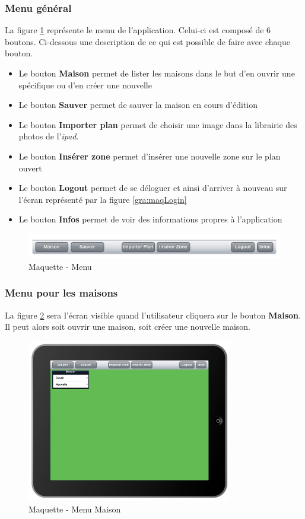 \subsubsection{Menu général}
La figure \ref{gra:maqmenu} représente le menu de l'application. Celui-ci est composé de 6 boutons. Ci-dessous une description de ce qui est possible de faire avec chaque bouton.

\medskip

\begin{itemize}
  \item Le bouton \textbf{Maison} permet de lister les maisons dans le but d'en ouvrir une spécifique ou d'en créer une nouvelle
  \item Le bouton \textbf{Sauver} permet de sauver la maison en cours d'édition
  \item Le bouton \textbf{Importer plan} permet de choisir une image dans la librairie des photos de l'\emph{\gls{ipad}}.
  \item Le bouton \textbf{Insérer zone} permet d'insérer une nouvelle zone sur le plan ouvert
  \item Le bouton \textbf{Logout} permet de se déloguer et ainsi d'arriver à nouveau sur l'écran représenté par la figure \ref{gra:maqLogin} 
  \item Le bouton   \textbf{Infos} permet de voir des informations propres à l'application
\end{itemize}
\begin{figure}[H]
      \centering
      \includegraphics[width=\textwidth]{00_media/04_Maquette_Menu.pdf}
      \caption{Maquette - Menu}
      \label{gra:maqmenu}
\end{figure}
\subsubsection{Menu pour les maisons}
La figure \ref{gra:maq01} sera l'écran visible quand l'utilisateur cliquera sur le bouton \textbf{Maison}. Il peut alors soit ouvrir une maison, soit créer une nouvelle maison.
\begin{figure}[H]
      \centering
      \includegraphics[width=9cm]{00_media/04_Maquette_01.pdf}
      \caption{Maquette - Menu Maison}
      \label{gra:maq01}
\end{figure}
